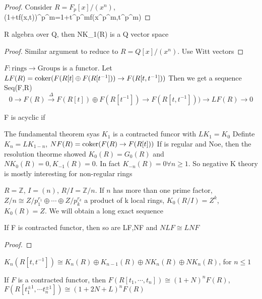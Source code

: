 \documentclass[main]{subfiles}
\begin{document}
\begin{proof}
Consider $R=F_p[x]/(x^n)$, (1+tf(x,t))^{p^m=1+t^{p^m}f(x^{p^m},t^{p^m})}
\end{proof}

\begin{proposition}
R algebra over Q, then NK_1(R) is a Q vector space
\end{proposition}

\begin{proof}
Similar argument to reduce to $R=Q[x]/(x^n)$. Use Witt vectors
\end{proof}

\begin{definition}
$F:\text{rings}\to \text{Groups}$ is a functor. Let $LF(R)=\operatorname{coker}(F(R[t]\oplus F(R[t^{-1}]))\to F(R[t,t^{-1}]))$
Then we get a sequence Seq(F,R)
\[0\to F(R)\xrightarrow\Delta F(R[t])\oplus F(R[t^{-1}]) \to F(R[t,t^{-1}]))\to LF(R)\to0\]

F is acyclic if 

The fundamental theorem syas $K_1$ is a contracted funcor with $LK_1=K_0$
Definte $K_n=LK_{1-n}$, $NF(R)=\operatorname{coker}(F(R)\to F(R[t]))$
If is regular and Noe, then the resolution theorme showed $K_0(R)=G_0(R)$ and $NK_0(R)=0,K_{-1}(R)=0$. In fact $K_{-n}(R)=0\forall n\geq1$. So negative K theory is mostly interesting for non-regular rings
\end{definition}

\begin{example}
$R=\mathbb Z$, $I=(n)$, $R/I=\mathbb Z/n$. If $n$ has more than one prime factor, $Z/n\cong Z/p_1^{r_1}\oplus\cdots\oplus Z/p_k^{r_k}$ a product of k local rings, $K_0(R/I)=Z^k$, $K_0(R)=Z$. We will obtain a long exact sequence
\end{example}

\begin{proposition}
If F is contracted functor, then so are LF,NF and $NLF\cong LNF$
\end{proposition}

\begin{proof}

\end{proof}

\begin{theorem}
$K_n(R[t,t^{-1}])\cong K_n(R)\oplus K_{n-1}(R)\oplus NK_n(R)\oplus NK_n(R)$, for $n\leq1$
\end{theorem}

\begin{corollary}
If $F$ is a contracted functor, then $F(R[t_1,\cdots,t_n])\cong (1+N)^nF(R)$, $F(R[t_1^{\pm1},\cdots t_n^{\pm1}])\cong(1+2N+L)^nF(R)$
\end{corollary}
\end{document}
